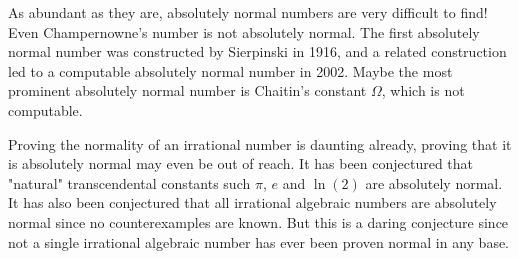 \documentclass[12pt]{article}
\begin{document}
As abundant as they are, absolutely normal numbers are very difficult to find!  Even Champernowne's number is not absolutely normal.  The first absolutely normal number was constructed by Sierpinski in 1916, and a related construction led to a computable absolutely normal number in 2002. Maybe the most prominent absolutely normal number is Chaitin's constant $\Omega$, which is not computable. 

Proving the normality of an irrational number is daunting already, proving that it is absolutely normal may even be out of reach. It has been conjectured that "natural" transcendental constants such $\pi$, $e$ and $\ln(2)$ are absolutely normal. It has also been conjectured that all irrational algebraic numbers are absolutely normal since no counterexamples are known. But this is a daring conjecture since not a single irrational algebraic number has ever been proven normal in any base.
\end{document}
